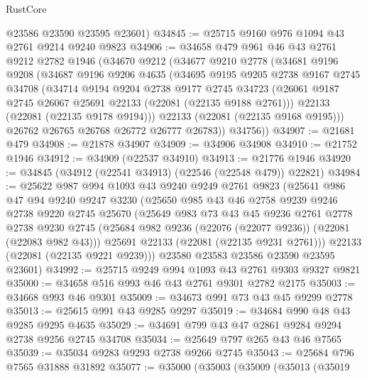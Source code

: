 \begin{lexlean}{RustCore}
\begin{coremodule}
      @23586
      @23590
      @23595
      @23601)
@34845 := @25715 @9160 @976 @1094 @43 @2761 @9214 @9240 @9823
@34906 := @34658
    @479
    @961
    @46
    @43
    @2761
    @9212
    @2782
    @1946
    (@34670
      @9212
      (@34677
        @9210
        @2778
        (@34681
          @9196
          @9208
          (@34687
            @9196
            @9206
            @4635
            (@34695
              @9195
              @9205
              @2738
              @9167
              @2745
              @34708
              (@34714
                @9194
                @9204
                @2738
                @9177
                @2745
                @34723
                (@26061 @9187 @2745 @26067 @25691 @22133 (@22081 (@22135 @9188 @2761)))
                @22133
                (@22081 (@22135 @9178 @9194)))
              @22133
              (@22081 (@22135 @9168 @9195)))
            @26762
            @26765
            @26768
            @26772
            @26777
            @26783))
        @34756))
@34907 := @21681 @479
@34908 := @21878 @34907
@34909 := @34906 @34908
@34910 := @21752 @1946
@34912 := @34909 (@22537 @34910)
@34913 := @21776 @1946
@34920 := @34845 (@34912 (@22541 @34913) (@22546 (@22548 @479)) @22821)
@34984 := @25622
    @987
    @994
    @1093
    @43
    @9240
    @9249
    @2761
    @9823
    (@25641
      @986
      @47
      @94
      @9240
      @9247
      @3230
      (@25650
        @985
        @43
        @46
        @2758
        @9239
        @9246
        @2738
        @9220
        @2745
        @25670
        (@25649
          @983
          @73
          @43
          @45
          @9236
          @2761
          @2778
          @2738
          @9230
          @2745
          (@25684 @982 @9236 (@22076 (@22077 @9236)) (@22081 (@22083 @982 @43)))
          @25691
          @22133
          (@22081 (@22135 @9231 @2761)))
        @22133
        (@22081 (@22135 @9221 @9239)))
      @23580
      @23583
      @23586
      @23590
      @23595
      @23601)
@34992 := @25715 @9249 @994 @1093 @43 @2761 @9303 @9327 @9821
@35000 := @34658 @516 @993 @46 @43 @2761 @9301 @2782 @2175
@35003 := @34668 @993 @46 @9301
@35009 := @34673 @991 @73 @43 @45 @9299 @2778
@35013 := @25615 @991 @43 @9285 @9297
@35019 := @34684 @990 @48 @43 @9285 @9295 @4635
@35029 := @34691 @799 @43 @47 @2861 @9284 @9294 @2738 @9256 @2745 @34708
@35034 := @25649 @797 @265 @43 @46 @7565
@35039 := @35034 @9283 @9293 @2738 @9266 @2745
@35043 := @25684 @796 @7565 @31888 @31892
@35077 := @35000
    (@35003
      (@35009
        (@35013
          (@35019

\end{coremodule}
\end{lexlean}
